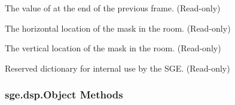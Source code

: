 \documentclass[letterpaper,10pt,english]{sphinxmanual}
\begin{document}
\begin{fulllineitems}

\begin{fulllineitems}
\label{dsp:sge.dsp.Object.yprevious}
The value of {\hyperref[dsp:sge.dsp.Object.y]{\emph{}}} at the end of the previous frame.
(Read-only)

\end{fulllineitems}


\begin{fulllineitems}
\label{dsp:sge.dsp.Object.mask_x}
The horizontal location of the mask in the room.  (Read-only)

\end{fulllineitems}


\begin{fulllineitems}
\label{dsp:sge.dsp.Object.mask_y}
The vertical location of the mask in the room.  (Read-only)

\end{fulllineitems}


\begin{fulllineitems}
\label{dsp:sge.dsp.Object.rd}
Reserved dictionary for internal use by the SGE.  (Read-only)

\end{fulllineitems}


\end{fulllineitems}



\subsubsection{sge.dsp.Object Methods}
\label{dsp:sge-dsp-object-methods}
\end{document}

